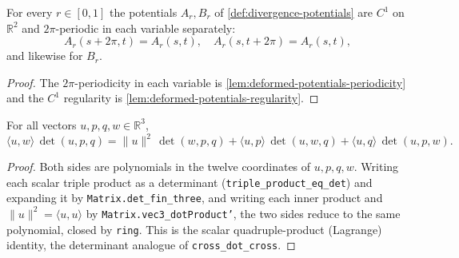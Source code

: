 \begin{lemma}
    \label{lem:deformed-potentials-periodic}
    For every $r\in[0,1]$ the potentials $A_r,B_r$ of
    \cref{def:divergence-potentials} are $C^1$ on $\mathbb{R}^2$ and $2\pi$-periodic
    in each variable separately:
    \[
        A_r(s+2\pi,t)=A_r(s,t),\quad A_r(s,t+2\pi)=A_r(s,t),
    \]
    and likewise for $B_r$.
\end{lemma}
\begin{proof}
    The $2\pi$-periodicity in each variable is \cref{lem:deformed-potentials-periodicity}
    and the $C^1$ regularity is \cref{lem:deformed-potentials-regularity}.
\end{proof}

\begin{lemma}
    \label{lem:quadruple-product-identity}
    \leanok
    For all vectors $u,p,q,w\in\mathbb{R}^3$,
    \[
        \langle u,w\rangle\,\det(u,p,q)
          = \lVert u\rVert^{2}\,\det(w,p,q)
          + \langle u,p\rangle\,\det(u,w,q)
          + \langle u,q\rangle\,\det(u,p,w).
    \]
\end{lemma}
\begin{proof}
    Both sides are polynomials in the twelve coordinates of $u,p,q,w$. Writing each
    scalar triple product as a determinant (\texttt{triple\_product\_eq\_det}) and
    expanding it by \texttt{Matrix.det\_fin\_three}, and writing each inner product
    and $\lVert u\rVert^2=\langle u,u\rangle$ by \texttt{Matrix.vec3\_dotProduct'},
    the two sides reduce to the same polynomial, closed by \texttt{ring}. This is
    the scalar quadruple-product (Lagrange) identity, the determinant analogue of
    \texttt{cross\_dot\_cross}.
\end{proof}

